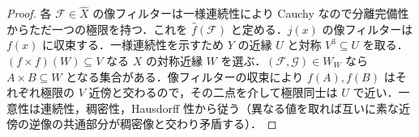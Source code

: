 \begin{proof}
各 $\mathcal F\in\widehat X$ の像フィルターは一様連続性により Cauchy なので分離完備性からただ一つの極限を持つ．これを $\widehat f(\mathcal F)$ と定める．$j(x)$ の像フィルターは $f(x)$ に収束する．一様連続性を示すため $Y$ の近縁 $U$ と対称 $V^3\subseteq U$ を取る．$(f\times f)(W)\subseteq V$ なる $X$ の対称近縁 $W$ を選ぶ．$(\mathcal F,\mathcal G)\in W_W$ なら $A\times B\subseteq W$ となる集合がある．像フィルターの収束により $f(A),f(B)$ はそれぞれ極限の $V$ 近傍と交わるので，その二点を介して極限同士は $U$ で近い．一意性は連続性，稠密性，Hausdorff 性から従う（異なる値を取れば互いに素な近傍の逆像の共通部分が稠密像と交わり矛盾する）．
\end{proof}
